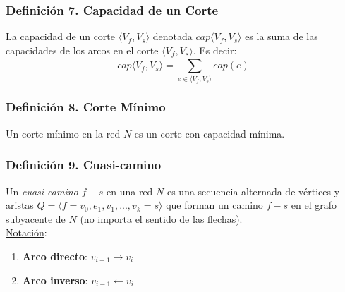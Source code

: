 \documentclass{article}
\newcommand{\bld}[1]{\textbf{#1}}
\newcommand{\sumatoria}[2]{\sum_{#1} ^{#2}}
\begin{document}
\subsubsection*{Definición 7. Capacidad de un Corte}
La capacidad de un corte $\langle V_f,V_s \rangle$ denotada $cap\langle V_f, V_s \rangle$ es la suma de las capacidades de los
arcos en el corte $\langle V_f, V_s \rangle$. Es decir:
\begin{equation*}
    cap\langle V_f , V_s \rangle = \sumatoria{e \in \langle V_f, V_s \rangle}{} cap(e)
\end{equation*}

\subsubsection*{Definición 8. Corte Mínimo}
Un corte mínimo en la red $N$ es un corte con capacidad mínima.

\subsubsection*{Definición 9. Cuasi-camino}
Un \emph{cuasi-camino $f-s$} en una red $N$ es una secuencia alternada de vértices y aristas
$Q = \langle f = v_0, e_1, v_1, ..., v_k = s \rangle$ que forman un camino $f-s$ en el grafo subyacente
de $N$ (no importa el sentido de las flechas).
\\\underline{Notación}:
\begin{enumerate}
    \item \bld{Arco directo}: $v_{i - 1} \rightarrow v_i$
    \item \bld{Arco inverso}: $v_{i - 1} \leftarrow v_i$
\end{enumerate}
\end{document}
